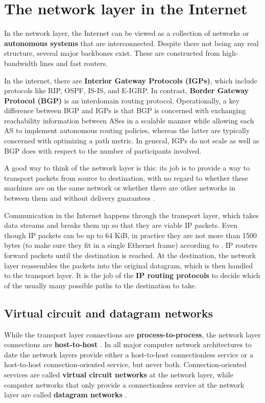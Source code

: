 \section{The network layer in the Internet}

In the network layer, the Internet can be viewed as a collection of networks or \textbf{autonomous systems} that are interconnected. Despite there not being any real structure, several major backbones exist. These are constructed from high-bandwidth lines and fast routers.

In the internet, there are \textbf{Interior Gateway Protocols (IGPs)}, which include protocols like RIP, OSPF, IS-IS, and E-IGRP.
In contrast, \textbf{Border Gateway Protocol (BGP)} is an interdomain routing protocol.
Operationally, a key difference between BGP and IGPs is that BGP is concerned with exchanging reachability information between ASes in a scalable manner while allowing each AS to implement autonomous routing policies, whereas the latter are typically concerned with optimizing a path metric.
In general, IGPs do not scale as well as BGP does with respect to the number of participants involved.

A good way to think of the network layer is this: its job is to provide a way to transport packets from source to destination, with no regard to whether these machines are on the same network or whether there are other networks in between them and without delivery guarantees \cite{computer-networks-tanenbaum-2012}.

Communication in the Internet happens through the transport layer, which takes data streams and breaks them up so that they are viable IP packets. Even though IP packets can be up to 64 KiB, in practice they are not more than 1500 bytes (to make sure they fit in a single Ethernet frame) according to \cite{computer-networks-tanenbaum-2012}.
IP routers forward packets until the destination is reached. At the destination, the network layer reassembles the packets into the original datagram, which is then handled to the transport layer.
It is the job of the \textbf{IP routing protocols} to decide which of the usually many possible paths to the destination to take.

\subsection{Virtual circuit and datagram networks}

While the transport layer connections are \textbf{process-to-process}, the network layer connections are \textbf{host-to-host} \cite[p.~313]{computer-networking-kurose-2012}.
In all major computer network architectures to date the network layers provide either a host-to-host connectionless service or a host-to-host connection-oriented service, but never both. Connection-oriented services are called \textbf{virtual circuit networks} at the network layer, while computer networks that only provide a connectionless service at the network layer are called \textbf{datagram networks} \cite[p.~313]{computer-networking-kurose-2012}.

